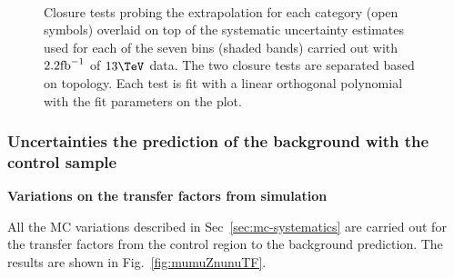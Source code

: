\begin{figure}[h!]
  \begin{center}
    ~~
    \caption{Closure tests probing the \bdphi extrapolation for each
      \njet category (open symbols) overlaid on top of the systematic
      uncertainty estimates used for each of the seven \scalht bins
      (shaded bands) carried out with $2.2\ifb$ of $13\tev$
      data. The two closure tests are separated based on topology.
      Each test is fit with a linear orthogonal polynomial with the
      fit parameters on the plot.}
    \label{fig:closureBDPhi}
  \end{center} 
\end{figure}

\subsubsection{Uncertainties the prediction of the \znunu
background with the \mmj control sample}

{\bf Variations on the transfer factors from simulation}

All the MC variations described in Sec~\ref{sec:mc-systematics} are
carried out for the transfer factors from the \mmj control region to
the \znunu background prediction. The results are shown in
Fig.~\ref{fig:mumuZnunuTF}.

